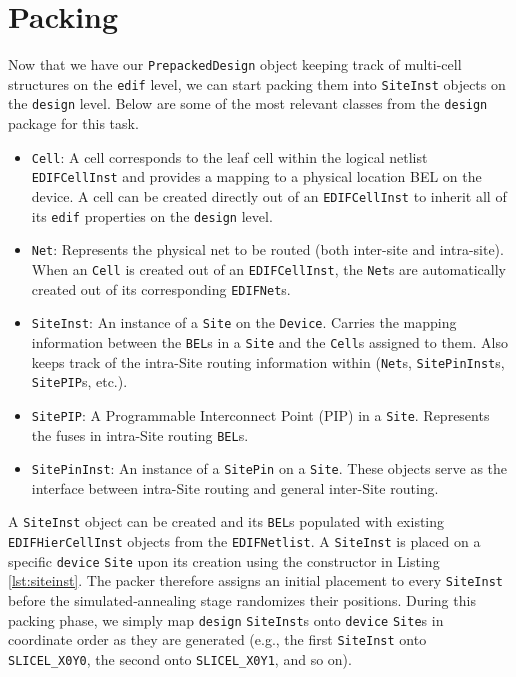 
\section{Packing}
\label{sec:packing}
Now that we have our \texttt{PrepackedDesign} object keeping track of multi-cell structures on the \texttt{edif} level, we can start packing them into \texttt{SiteInst} objects on the \texttt{design} level. 
Below are some of the most relevant classes from the \texttt{design} package for this task.
\begin{itemize}
    \item \texttt{Cell}: A cell corresponds to the leaf cell within the logical netlist \texttt{EDIFCellInst} and provides a mapping to a physical location BEL on the device. A cell can be created directly out of an \texttt{EDIFCellInst} to inherit all of its \texttt{edif} properties on the \texttt{design} level.
    \item \texttt{Net}: Represents the physical net to be routed (both inter-site and intra-site). When an \texttt{Cell} is created out of an \texttt{EDIFCellInst}, the \texttt{Net}s are automatically created out of its corresponding \texttt{EDIFNet}s.
    \item \texttt{SiteInst}: An instance of a \texttt{Site} on the \texttt{Device}. Carries the mapping information between the \texttt{BEL}s in a \texttt{Site} and the \texttt{Cell}s assigned to them. Also keeps track of the intra-Site routing information within (\texttt{Net}s, \texttt{SitePinInst}s, \texttt{SitePIP}s, etc.).
    \item \texttt{SitePIP}: A Programmable Interconnect Point (PIP) in a \texttt{Site}. Represents the fuses in intra-Site routing \texttt{BEL}s. 
    \item \texttt{SitePinInst}: An instance of a \texttt{SitePin} on a \texttt{Site}. These objects serve as the interface between intra-Site routing and general inter-Site routing. 
\end{itemize}

A \texttt{SiteInst} object can be created and its \texttt{BEL}s populated with existing \texttt{EDIFHierCellInst} objects from the \texttt{EDIFNetlist}. 
A \texttt{SiteInst} is placed on a specific \texttt{device} \texttt{Site} upon its creation using the constructor in Listing \ref{lst:siteinst}. 
The packer therefore assigns an initial placement to every \texttt{SiteInst} before the simulated‐annealing stage randomizes their positions. 
During this packing phase, we simply map \texttt{design} \texttt{SiteInst}s onto \texttt{device} \texttt{Site}s in coordinate order as they are generated (e.g., the first \texttt{SiteInst} onto \texttt{SLICEL\_X0Y0}, the second onto \texttt{SLICEL\_X0Y1}, and so on). 

